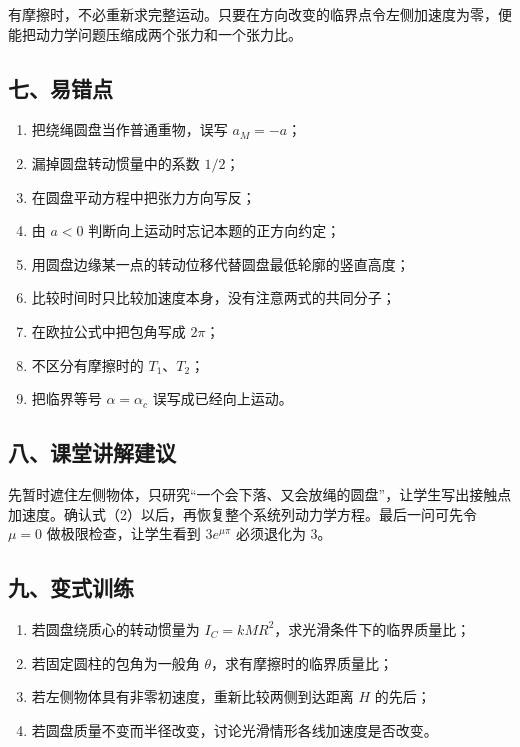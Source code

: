 \documentclass[12pt,a4paper,UTF8]{ctexart}
\newcommand{\tightlist}{\setlength{\itemsep}{0pt}\setlength{\parskip}{0pt}}
\begin{document}
有摩擦时，不必重新求完整运动。只要在方向改变的临界点令左侧加速度为零，便能把动力学问题压缩成两个张力和一个张力比。

\subsection{七、易错点}\label{ux4e03ux6613ux9519ux70b9-3}

\begin{enumerate}
\def\labelenumi{\arabic{enumi}.}
\tightlist
\item
  把绕绳圆盘当作普通重物，误写 \(a_M=-a\)；
\item
  漏掉圆盘转动惯量中的系数 \(1/2\)；
\item
  在圆盘平动方程中把张力方向写反；
\item
  由 \(a<0\) 判断向上运动时忘记本题的正方向约定；
\item
  用圆盘边缘某一点的转动位移代替圆盘最低轮廓的竖直高度；
\item
  比较时间时只比较加速度本身，没有注意两式的共同分子；
\item
  在欧拉公式中把包角写成 \(2\pi\)；
\item
  不区分有摩擦时的 \(T_1\)、\(T_2\)；
\item
  把临界等号 \(\alpha=\alpha_c\) 误写成已经向上运动。
\end{enumerate}

\subsection{八、课堂讲解建议}\label{ux516bux8bfeux5802ux8bb2ux89e3ux5efaux8bae-3}

先暂时遮住左侧物体，只研究``一个会下落、又会放绳的圆盘''，让学生写出接触点加速度。确认式（2）以后，再恢复整个系统列动力学方程。最后一问可先令
\(\mu=0\) 做极限检查，让学生看到 \(3e^{\mu\pi}\) 必须退化为 \(3\)。

\subsection{九、变式训练}\label{ux4e5dux53d8ux5f0fux8badux7ec3-3}

\begin{enumerate}
\def\labelenumi{\arabic{enumi}.}
\tightlist
\item
  若圆盘绕质心的转动惯量为 \(I_C=kMR^2\)，求光滑条件下的临界质量比；
\item
  若固定圆柱的包角为一般角 \(\theta\)，求有摩擦时的临界质量比；
\item
  若左侧物体具有非零初速度，重新比较两侧到达距离 \(H\) 的先后；
\item
  若圆盘质量不变而半径改变，讨论光滑情形各线加速度是否改变。
\end{enumerate}
\end{document}
